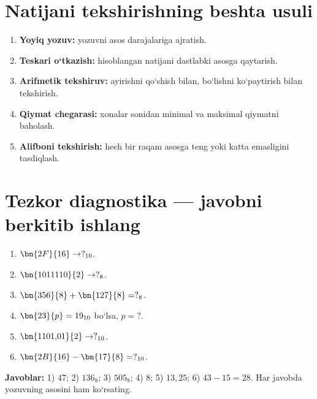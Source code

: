 \documentclass[11pt,a4paper,openany,oneside]{book}
\begin{document}
\section{Natijani tekshirishning beshta usuli}
\begin{enumerate}
\item \textbf{Yoyiq yozuv:} yozuvni asos darajalariga ajratish.
\item \textbf{Teskari o‘tkazish:} hisoblangan natijani dastlabki asosga qaytarish.
\item \textbf{Arifmetik tekshiruv:} ayirishni qo‘shish bilan, bo‘lishni ko‘paytirish bilan tekshirish.
\item \textbf{Qiymat chegarasi:} xonalar sonidan minimal va maksimal qiymatni baholash.
\item \textbf{Alifboni tekshirish:} hech bir raqam asosga teng yoki katta emasligini tasdiqlash.
\end{enumerate}
\section{Tezkor diagnostika — javobni berkitib ishlang}
\begin{enumerate}
\item \(\bn{2F}{16}\to ?_{10}\).
\item \(\bn{1011110}{2}\to ?_8\).
\item \(\bn{356}{8}+\bn{127}{8}=?_8\).
\item \(\bn{23}{p}=19_{10}\) bo‘lsa, \(p=?\).
\item \(\bn{1101{,}01}{2}\to ?_{10}\).
\item \(\bn{2B}{16}-\bn{17}{8}=?_{10}\).
\end{enumerate}
\textbf{Javoblar:} 1) 47; 2) \(136_8\); 3) \(505_8\); 4) 8; 5) \(13{,}25\); 6) \(43-15=28\). Har javobda yozuvning asosini ham ko‘rsating.
\end{document}
